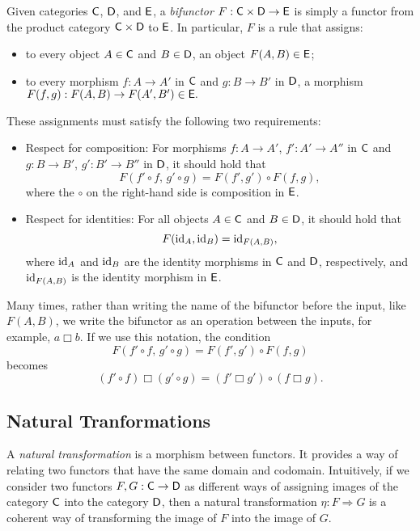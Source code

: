 \begin{definition}
  Given categories $\mathsf{C}$, $\mathsf{D}$, and $\mathsf{E}$, a \emph{bifunctor}
$F : \mathsf{C} \times \mathsf{D} \to \mathsf{E}$
is simply a functor from the product category $\mathsf{C} \times \mathsf{D}$ to $\mathsf{E}$. In particular, $F$ is a rule that assigns:
\begin{itemize}
    \item to every object $A \in \mathsf{C}$ and $B \in \mathsf{D}$, an object $F(A, B) \in \mathsf{E}$;
    \item to every morphism $f : A \to A'$ in $\mathsf{C}$ and $g : B \to B'$ in $\mathsf{D}$, a morphism
    $F(f, g) : F(A, B) \to F(A', B') \in \mathsf{E}.$
\end{itemize}

These assignments must satisfy the following two requirements:

\begin{itemize}
    \item Respect for composition:  
    For morphisms $f : A \to A'$, $f' : A' \to A''$ in $\mathsf{C}$ and $g : B \to B'$, $g' : B' \to B''$ in $\mathsf{D}$, it should hold that
    \[
    F(f' \circ f,\, g' \circ g) = F(f', g') \circ F(f, g),
    \]
    where the $\circ$ on the right-hand side is composition in $\mathsf{E}$.

    \item Respect for identities:  
    For all objects $A \in \mathsf{C}$ and $B \in \mathsf{D}$, it should hold that
    \[
    F(\mathrm{id}_A, \mathrm{id}_B) = \mathrm{id}_{F(A, B)},
    \]
    where $\mathrm{id}_A$ and $\mathrm{id}_B$ are the identity morphisms in $\mathsf{C}$ and $\mathsf{D}$, respectively, and $\mathrm{id}_{F(A, B)}$ is the identity morphism in $\mathsf{E}$.
\end{itemize}

Many times, rather than writing the name of the bifunctor before the input, like $F(A, B)$, we write the bifunctor as an operation between the inputs, for example, $a \mathbin{\Box} b$. If we use this notation, the condition
\[
F(f' \circ f,\, g' \circ g) = F(f', g') \circ F(f, g)
\]
becomes
\[
(f' \circ f) \mathbin{\Box} (g' \circ g) = (f' \mathbin{\Box} g') \circ (f \mathbin{\Box} g).
\]
\end{definition}

\subsection{Natural Tranformations}
A \emph{natural transformation} is a morphism between functors. It provides a way of relating two functors that have the same domain and codomain. Intuitively, if we consider two functors $F, G : \mathsf{C} \to \mathsf{D}$ as different ways of assigning images of the category $\mathsf{C}$ into the category $\mathsf{D}$, then a natural transformation $\eta : F \Rightarrow G$ is a coherent way of transforming the image of $F$ into the image of $G$.

